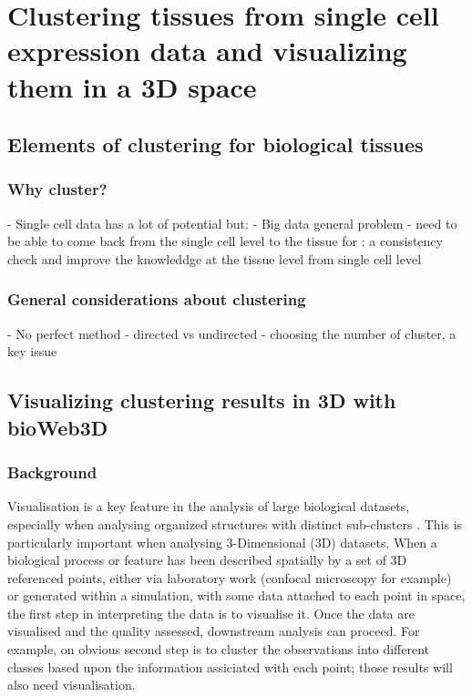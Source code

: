 \chapter{Clustering tissues from single cell expression data and visualizing them in a 3D space}\label{ch:non_spatial_clustering_visualization} 
\section{Elements of clustering for biological tissues}
	\subsection{Why cluster?}
    - Single cell data has a lot of potential but:
    - Big data general problem
    - need to be able to come back from the single cell level to the tissue for : a consistency check and improve the knowleddge at the tissue level from single cell level

	\subsection{General considerations about clustering}
    - No perfect method
    - directed vs undirected
    - choosing the number of cluster, a key issue

\section{Visualizing clustering results in 3D with bioWeb3D}
	\subsection{Background}

Visualisation is a key feature in the analysis of large biological datasets, especially when analysing organized structures with distinct sub-clusters \cite{Rubel10}. This is particularly important when analysing 3-Dimensional (3D) datasets. When a biological process or feature has been described spatially by a set of 3D referenced points, either via laboratory work (confocal microscopy for example) or generated within a simulation, with some data attached to each point in space, the first step in interpreting the data is to visualise it. Once the data are visualised and the quality assessed, downstream analysis can proceed. For example, on obvious second step is to cluster the observations into different classes based upon the information assiciated with each point; those results will also need visualisation. \\

